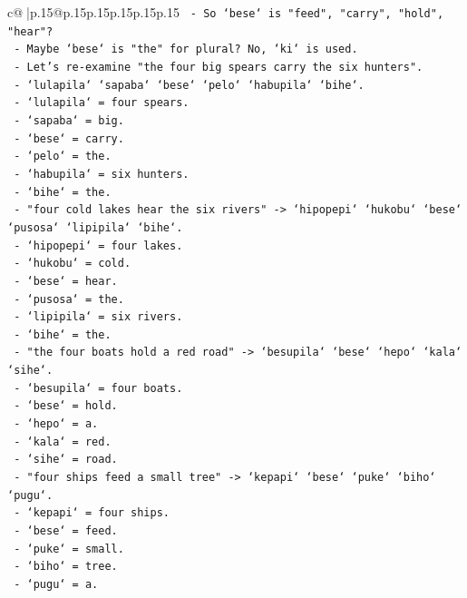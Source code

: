 \documentclass{article}
\begin{document}
{\begin{supertabular}{c@{$\;$}|p{.15\linewidth}@{}p{.15\linewidth}p{.15\linewidth}p{.15\linewidth}p{.15\linewidth}p{.15\linewidth}}
{{{\texttt{    {-} So `bese` is "feed", "carry", "hold", "hear"?} \\
\texttt{    {-} Maybe `bese` is "the" for plural? No, `ki` is used.} \\
\texttt{    {-} Let's re{-}examine "the four big spears carry the six hunters".} \\
\texttt{      {-} `lulapila` `sapaba` `bese` `pelo` `habupila` `bihe`.} \\
\texttt{      {-} `lulapila` = four spears.} \\
\texttt{      {-} `sapaba` = big.} \\
\texttt{      {-} `bese` = carry.} \\
\texttt{      {-} `pelo` = the.} \\
\texttt{      {-} `habupila` = six hunters.} \\
\texttt{      {-} `bihe` = the.} \\
\texttt{    {-} "four cold lakes hear the six rivers" {-}> `hipopepi` `hukobu` `bese` `pusosa` `lipipila` `bihe`.} \\
\texttt{      {-} `hipopepi` = four lakes.} \\
\texttt{      {-} `hukobu` = cold.} \\
\texttt{      {-} `bese` = hear.} \\
\texttt{      {-} `pusosa` = the.} \\
\texttt{      {-} `lipipila` = six rivers.} \\
\texttt{      {-} `bihe` = the.} \\
\texttt{    {-} "the four boats hold a red road" {-}> `besupila` `bese` `hepo` `kala` `sihe`.} \\
\texttt{      {-} `besupila` = four boats.} \\
\texttt{      {-} `bese` = hold.} \\
\texttt{      {-} `hepo` = a.} \\
\texttt{      {-} `kala` = red.} \\
\texttt{      {-} `sihe` = road.} \\
\texttt{    {-} "four ships feed a small tree" {-}> `kepapi` `bese` `puke` `biho` `pugu`.} \\
\texttt{      {-} `kepapi` = four ships.} \\
\texttt{      {-} `bese` = feed.} \\
\texttt{      {-} `puke` = small.} \\
\texttt{      {-} `biho` = tree.} \\
\texttt{      {-} `pugu` = a.} \\
}}}
\end{supertabular}}
\end{document}
